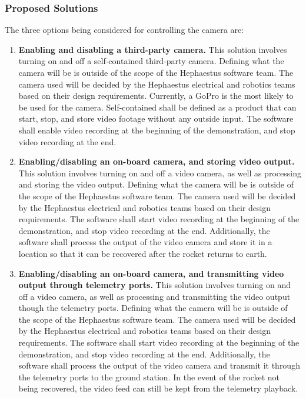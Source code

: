 \documentclass[letterpaper,10pt]{article}
\begin{document}
\subsubsection{Proposed Solutions}
The three options being considered for controlling the camera are:
\begin{enumerate}
\item{
\textbf{Enabling and disabling a third-party camera.}
This solution involves turning on and off a self-contained third-party camera.
Defining what the camera will be is outside of the scope of the Hephaestus software team.
The camera used will be decided by the Hephaestus electrical and robotics teams
based on their design requirements.
Currently, a GoPro is the most likely to be used for the camera.
Self-contained shall be defined as a product that can start, stop, and store video
footage without any outside input.
The software shall enable video recording at the beginning of the demonstration,
and stop video recording at the end.
}

\item{
\textbf{Enabling/disabling an on-board camera, and storing video output.}
This solution involves turning on and off a video camera, as well as processing and storing the video output.
Defining what the camera will be is outside of the scope of the Hephaestus software team.
The camera used will be decided by the Hephaestus electrical and robotics teams
based on their design requirements.
The software shall start video recording at the beginning of the demonstration,
and stop video recording at the end.
Additionally, the software shall process the output of the video camera and store
it in a location so that it can be recovered after the rocket returns to earth.
}

\item{
\textbf{Enabling/disabling an on-board camera, and transmitting video output through telemetry ports.}
This solution involves turning on and off a video camera, as well as processing and transmitting the video output though the telemetry ports.
Defining what the camera will be is outside of the scope of the Hephaestus software team.
The camera used will be decided by the Hephaestus electrical and robotics teams
based on their design requirements.
The software shall start video recording at the beginning of the demonstration,
and stop video recording at the end.
Additionally, the software shall process the output of the video camera and transmit
it through the telemetry ports to the ground station.
In the event of the rocket not being recovered, the video feed can still be kept
from the telemetry playback.
}
\end{enumerate}
\end{document}
